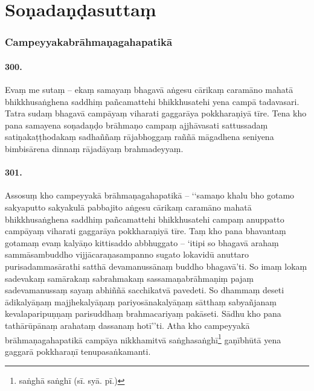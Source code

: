 \section{Soṇadaṇḍasuttaṃ}

\subsubsection{Campeyyakabrāhmaṇagahapatikā}

\paragraph{300.} Evaṃ me sutaṃ – ekaṃ samayaṃ bhagavā aṅgesu cārikaṃ caramāno mahatā bhikkhusaṅghena saddhiṃ pañcamattehi bhikkhusatehi yena campā tadavasari. Tatra sudaṃ bhagavā campāyaṃ viharati gaggarāya pokkharaṇiyā tīre. Tena kho pana samayena soṇadaṇḍo brāhmaṇo campaṃ ajjhāvasati sattussadaṃ satiṇakaṭṭhodakaṃ sadhaññaṃ rājabhoggaṃ raññā māgadhena seniyena bimbisārena dinnaṃ rājadāyaṃ brahmadeyyaṃ.

\paragraph{301.} Assosuṃ kho campeyyakā brāhmaṇagahapatikā – ‘‘samaṇo khalu bho gotamo sakyaputto sakyakulā pabbajito aṅgesu cārikaṃ caramāno mahatā bhikkhusaṅghena saddhiṃ pañcamattehi bhikkhusatehi campaṃ anuppatto campāyaṃ viharati gaggarāya pokkharaṇiyā tīre. Taṃ kho pana bhavantaṃ gotamaṃ evaṃ kalyāṇo kittisaddo abbhuggato – ‘itipi so bhagavā arahaṃ sammāsambuddho vijjācaraṇasampanno sugato lokavidū anuttaro purisadammasārathi satthā devamanussānaṃ buddho bhagavā’ti. So imaṃ lokaṃ sadevakaṃ samārakaṃ sabrahmakaṃ sassamaṇabrāhmaṇiṃ pajaṃ sadevamanussaṃ sayaṃ abhiññā sacchikatvā pavedeti. So dhammaṃ deseti ādikalyāṇaṃ majjhekalyāṇaṃ pariyosānakalyāṇaṃ sātthaṃ sabyañjanaṃ kevalaparipuṇṇaṃ parisuddhaṃ brahmacariyaṃ pakāseti. Sādhu kho pana tathārūpānaṃ arahataṃ dassanaṃ hotī’’ti. Atha kho campeyyakā brāhmaṇagahapatikā campāya nikkhamitvā saṅghasaṅghī\footnote{saṅghā saṅghī (sī. syā. pī.)} gaṇībhūtā yena gaggarā pokkharaṇī tenupasaṅkamanti.

